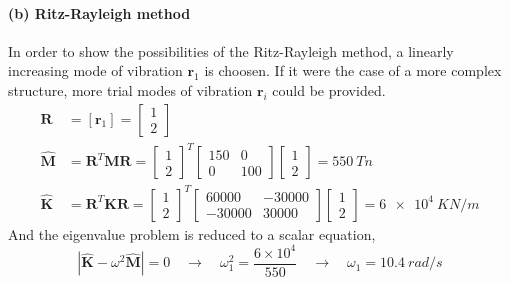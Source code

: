 \begin{Answer}[ref={two_storey}]
\paragraph{(b) Ritz-Rayleigh method}
In order to show the possibilities of the Ritz-Rayleigh method, a linearly increasing mode of vibration $\mathbf{r}_1$ is choosen. If it were the case of a more complex structure, more trial modes of vibration $\mathbf{r}_i$ could be provided.
\begin{align*}
\mathbf{R} &= [\mathbf{r}_1] = \begin{bmatrix}
    1 \\ 2
\end{bmatrix} \\
\hat{\mathbf{M}} &= \mathbf{R}^T\mathbf{M}\mathbf{R} = \begin{bmatrix}
    1 \\ 2
\end{bmatrix}^T \begin{bmatrix}
    150 & 0 \\
    0 & 100
\end{bmatrix} \begin{bmatrix}
    1 \\
    2
\end{bmatrix} = \SI{550}{Tn} \\
\hat{\mathbf{K}} &= \mathbf{R}^T\mathbf{K}\mathbf{R} = \begin{bmatrix}
    1 \\ 2
\end{bmatrix}^T \begin{bmatrix}
    60000 & -30000 \\
    -30000 & 30000
\end{bmatrix} \begin{bmatrix}
    1 \\
    2
\end{bmatrix} = \SI{6e4}{KN/m}
\end{align*}
And the eigenvalue problem is reduced to a scalar equation,
$$
|\hat{\mathbf{K}} - \omega^2\hat{\mathbf{M}}| = 0
\quad\rightarrow\quad \omega_1^2 = \frac{6\times10^4}{550} \quad\rightarrow\quad \omega_1 = \SI{10.4}{rad/s}
$$

\end{Answer}
